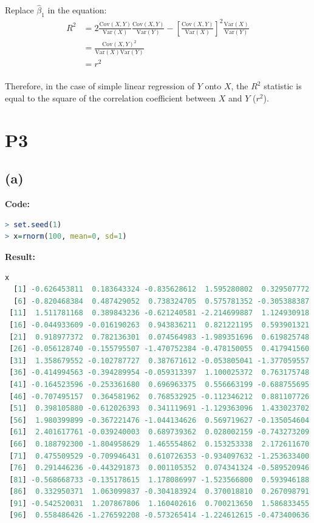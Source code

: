 \documentclass[twoside]{homework}
\begin{document}
Replace $\hat{\beta}_1$ in the equation:\\
\begin{equation}
    \begin{aligned}
    R^2 &= 2 \frac{\mathrm{Cov}(X, Y)}{\mathrm{Var}(X)} \frac{\mathrm{Cov}(X,Y)}{\mathrm{Var}(Y)} - [\frac{\mathrm{Cov}(X, Y)}{\mathrm{Var}(X)}]^2 \frac{\mathrm{Var}(X)}{\mathrm{Var}(Y)}\\
    &= \frac{\mathrm{Cov}(X,Y)^2}{\mathrm{Var}(X) \mathrm{Var}(Y)}\\
    &= r^2
    \end{aligned}
\end{equation}{}\\
Therefore, in the case of simple linear regression of $Y$ onto $X$, the $R^2$ statistic is equal to the square of the correlation coefficient between $X$ and $Y$ ($r^2$).

\newpage

\section*{P3}
\subsection*{(a)}
\textbf{Code:}
\begin{lstlisting}[language=R]
> set.seed(1)
> x=rnorm(100, mean=0, sd=1)
\end{lstlisting}
\textbf{Result:}
\begin{lstlisting}[language=R]
x
  [1] -0.626453811  0.183643324 -0.835628612  1.595280802  0.329507772
  [6] -0.820468384  0.487429052  0.738324705  0.575781352 -0.305388387
 [11]  1.511781168  0.389843236 -0.621240581 -2.214699887  1.124930918
 [16] -0.044933609 -0.016190263  0.943836211  0.821221195  0.593901321
 [21]  0.918977372  0.782136301  0.074564983 -1.989351696  0.619825748
 [26] -0.056128740 -0.155795507 -1.470752384 -0.478150055  0.417941560
 [31]  1.358679552 -0.102787727  0.387671612 -0.053805041 -1.377059557
 [36] -0.414994563 -0.394289954 -0.059313397  1.100025372  0.763175748
 [41] -0.164523596 -0.253361680  0.696963375  0.556663199 -0.688755695
 [46] -0.707495157  0.364581962  0.768532925 -0.112346212  0.881107726
 [51]  0.398105880 -0.612026393  0.341119691 -1.129363096  1.433023702
 [56]  1.980399899 -0.367221476 -1.044134626  0.569719627 -0.135054604
 [61]  2.401617761 -0.039240003  0.689739362  0.028002159 -0.743273209
 [66]  0.188792300 -1.804958629  1.465554862  0.153253338  2.172611670
 [71]  0.475509529 -0.709946431  0.610726353 -0.934097632 -1.253633400
 [76]  0.291446236 -0.443291873  0.001105352  0.074341324 -0.589520946
 [81] -0.568668733 -0.135178615  1.178086997 -1.523566800  0.593946188
 [86]  0.332950371  1.063099837 -0.304183924  0.370018810  0.267098791
 [91] -0.542520031  1.207867806  1.160402616  0.700213650  1.586833455
 [96]  0.558486426 -1.276592208 -0.573265414 -1.224612615 -0.473400636
\end{lstlisting}
\end{document}
